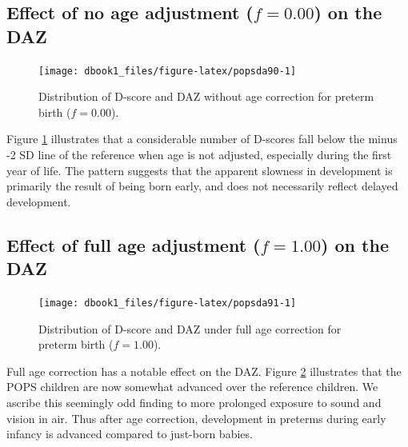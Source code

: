 \documentclass[
]{book}
\begin{document}
\hypertarget{effect-of-no-age-adjustment-f-0.00-on-the-daz}{%
\subsection{\texorpdfstring{Effect of no age adjustment (\(f = 0.00\)) on the DAZ}{Effect of no age adjustment (f = 0.00) on the DAZ}}\label{effect-of-no-age-adjustment-f-0.00-on-the-daz}}

\begin{figure}

{\centering \texttt{[image: dbook1\_files/figure-latex/popsda90-1]} 

}

\caption{Distribution of D-score and DAZ without age correction for preterm birth (\(f = 0.00\)).}\label{fig:popsda90}
\end{figure}



Figure \ref{fig:popsda90} illustrates that a considerable number of D-scores fall below the minus -2 SD line of the reference when age is not adjusted, especially during the first year of life. The pattern suggests that the apparent slowness in development is primarily the result of being born early, and does not necessarily reflect delayed development.

\hypertarget{effect-of-full-age-adjustment-f-1.00-on-the-daz}{%
\subsection{\texorpdfstring{Effect of full age adjustment (\(f = 1.00\)) on the DAZ}{Effect of full age adjustment (f = 1.00) on the DAZ}}\label{effect-of-full-age-adjustment-f-1.00-on-the-daz}}

\begin{figure}

{\centering \texttt{[image: dbook1\_files/figure-latex/popsda91-1]} 

}

\caption{Distribution of D-score and DAZ under full age correction for preterm birth (\(f = 1.00\)).}\label{fig:popsda91}
\end{figure}



Full age correction has a notable effect on the DAZ. Figure \ref{fig:popsda91} illustrates that the POPS children are now somewhat advanced over the reference children. We ascribe this seemingly odd finding to more prolonged exposure to sound and vision in air. Thus after age correction, development in preterms during early infancy is advanced compared to just-born babies.
\end{document}
